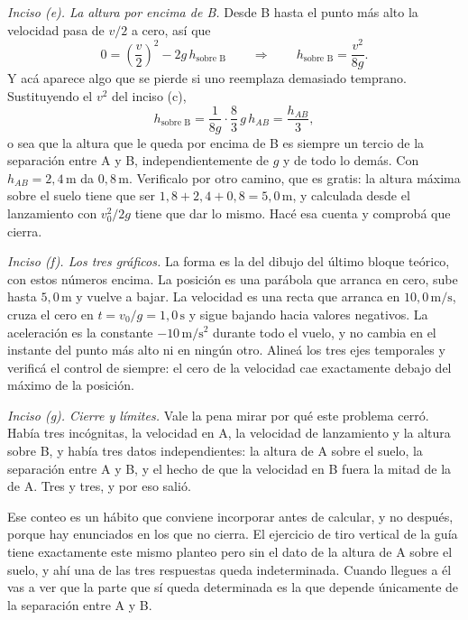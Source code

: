 \documentclass[11pt,openany]{book}
\begin{document}
\begin{ejemplo}[completo]
\medskip
\textit{Inciso (e). La altura por encima de B.} Desde B hasta el punto más alto la velocidad pasa de $v/2$ a cero, así que
\[
0 = \left(\frac{v}{2}\right)^{2} - 2g\,h_{\text{sobre B}}
\qquad\Longrightarrow\qquad
h_{\text{sobre B}} = \frac{v^2}{8g}.
\]
Y acá aparece algo que se pierde si uno reemplaza demasiado temprano. Sustituyendo el $v^2$ del inciso (c),
\[
h_{\text{sobre B}} = \frac{1}{8g}\cdot\frac{8}{3}\,g\,h_{AB} = \frac{h_{AB}}{3},
\]
o sea que la altura que le queda por encima de B es siempre un tercio de la separación entre A y B, independientemente de $g$ y de todo lo demás. Con $h_{AB}=2{,}4\,\mathrm{m}$ da $0{,}8\,\mathrm{m}$. Verificalo por otro camino, que es gratis: la altura máxima sobre el suelo tiene que ser $1{,}8 + 2{,}4 + 0{,}8 = 5{,}0\,\mathrm{m}$, y calculada desde el lanzamiento con $v_0^2/2g$ tiene que dar lo mismo. Hacé esa cuenta y comprobá que cierra.

\medskip
\textit{Inciso (f). Los tres gráficos.} La forma es la del dibujo del último bloque teórico, con estos números encima. La posición es una parábola que arranca en cero, sube hasta $5{,}0\,\mathrm{m}$ y vuelve a bajar. La velocidad es una recta que arranca en $10{,}0\,\mathrm{m/s}$, cruza el cero en $t=v_0/g=1{,}0\,\mathrm{s}$ y sigue bajando hacia valores negativos. La aceleración es la constante $-10\,\mathrm{m/s^2}$ durante todo el vuelo, y no cambia en el instante del punto más alto ni en ningún otro. Alineá los tres ejes temporales y verificá el control de siempre: el cero de la velocidad cae exactamente debajo del máximo de la posición.

\medskip
\textit{Inciso (g). Cierre y límites.} Vale la pena mirar por qué este problema cerró. Había tres incógnitas, la velocidad en A, la velocidad de lanzamiento y la altura sobre B, y había tres datos independientes: la altura de A sobre el suelo, la separación entre A y B, y el hecho de que la velocidad en B fuera la mitad de la de A. Tres y tres, y por eso salió.

Ese conteo es un hábito que conviene incorporar antes de calcular, y no después, porque hay enunciados en los que no cierra. El ejercicio de tiro vertical de la guía tiene exactamente este mismo planteo pero sin el dato de la altura de A sobre el suelo, y ahí una de las tres respuestas queda indeterminada. Cuando llegues a él vas a ver que la parte que sí queda determinada es la que depende únicamente de la separación entre A y B.
\end{ejemplo}
\end{document}
